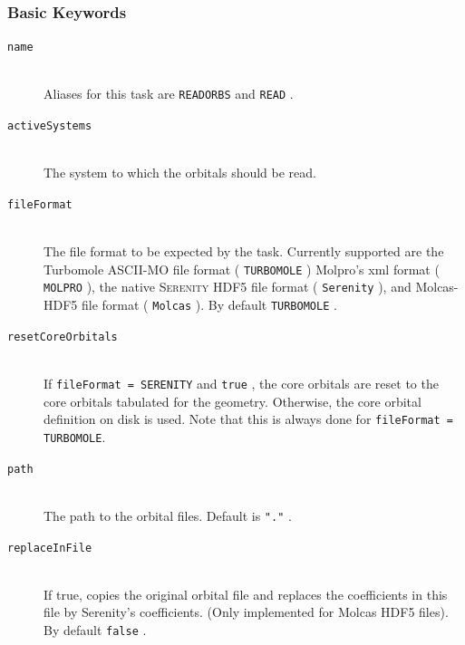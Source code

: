 \documentclass[bibliography=totocnumbered,a4paper,10pt,oneside]{scrbook}
\newcommand{\ttt}[1]{%
  \begingroup\setlength{\fboxsep}{1pt}%
  \colorbox{serenity-green!30}{\texttt{\hspace*{2pt}\vphantom{(g}#1\hspace*{2pt}}}%
  \endgroup
}
\begin{document}
\subsubsection{Basic Keywords}
\begin{description}
 \item [\texttt{name}]\hfill \\
  Aliases for this task are \ttt{READORBS} and \ttt{READ}.
 \item [\texttt{activeSystems}]\hfill \\
  The system to which the orbitals should be read.
 \item [\texttt{fileFormat}]\hfill \\
  The file format to be expected by the task. Currently supported are the Turbomole ASCII-MO file format (\ttt{TURBOMOLE})
  Molpro's xml format (\ttt{MOLPRO}), the native \textsc{Serenity} HDF5 file format (\ttt{Serenity}), and Molcas-HDF5 file
  format (\ttt{Molcas}). By default \ttt{TURBOMOLE}.
 \item [\texttt{resetCoreOrbitals}]\hfill \\
  If \texttt{fileFormat = SERENITY} and \ttt{true}, the core orbitals are reset to the core orbitals tabulated for the geometry. Otherwise, the core orbital
  definition on disk is used. Note that this is always done for \texttt{fileFormat = TURBOMOLE}.
 \item [\texttt{path}]\hfill \\
  The path to the orbital files. Default is \ttt{"."}.
 \item [\texttt{replaceInFile}]\hfill \\
  If true, copies the original orbital file and replaces the coefficients in this file by Serenity's coefficients. (Only implemented for Molcas HDF5 files).
  By default \ttt{false}.
\end{description}
\end{document}
